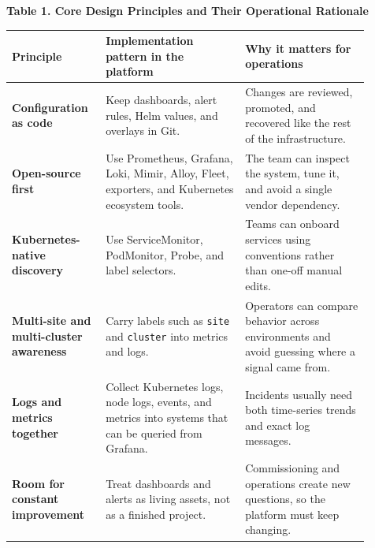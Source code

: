 \begin{center}
\begin{minipage}{\linewidth}
\renewcommand{\arraystretch}{1.3}
\small
\textbf{Table 1. Core Design Principles and Their Operational Rationale}\\[4pt]
\begin{tabular}{p{0.22\linewidth} p{0.36\linewidth} p{0.32\linewidth}}
\hline
\textbf{Principle} & \textbf{Implementation pattern in the platform} & \textbf{Why it matters for operations} \\
\hline
\textbf{Configuration as code} &
  Keep dashboards, alert rules, Helm values, and overlays in Git. &
  Changes are reviewed, promoted, and recovered like the rest of the infrastructure. \\[4pt]
\textbf{Open-source first} &
  Use Prometheus, Grafana, Loki, Mimir, Alloy, Fleet, exporters, and Kubernetes ecosystem tools. &
  The team can inspect the system, tune it, and avoid a single vendor dependency. \\[4pt]
\textbf{Kubernetes-native discovery} &
  Use ServiceMonitor, PodMonitor, Probe, and label selectors. &
  Teams can onboard services using conventions rather than one-off manual edits. \\[4pt]
\textbf{Multi-site and multi-cluster awareness} &
  Carry labels such as \texttt{site} and \texttt{cluster} into metrics and logs. &
  Operators can compare behavior across environments and avoid guessing where a signal came from. \\[4pt]
\textbf{Logs and metrics together} &
  Collect Kubernetes logs, node logs, events, and metrics into systems that can be queried from Grafana. &
  Incidents usually need both time-series trends and exact log messages. \\[4pt]
\textbf{Room for constant improvement} &
  Treat dashboards and alerts as living assets, not as a finished project. &
  Commissioning and operations create new questions, so the platform must keep changing. \\
\hline
\end{tabular}
\end{minipage}
\end{center}